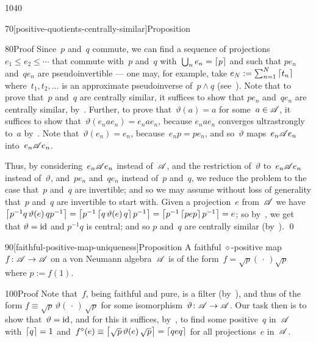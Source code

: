 \begin{parsec}{1040}
\begin{point}{70}[positive-quotients-centrally-similar]{Proposition}
\begin{point}{80}{Proof}
Since~$p$ and~$q$ commute,
we can find a sequence
of projections~$e_1\leq e_2 \leq \dotsb$
that commute with~$p$ and~$q$
with~$\bigcup_n e_n =\left\lceil p\right\rceil$
and such that $pe_n$ and~$qe_n$
are pseudoinvertible --- one may,
for example,
take $e_N:=\sum_{n=1}^N \left\lceil t_n\right\rceil$
where~$t_1,t_2,\dotsc$
is an approximate pseudoinverse
of~$p\wedge q$ (see~).
Note that to prove that~$p$ and~$q$ are centrally similar,
it suffices to show that $pe_n$ and~$qe_n$ are centrally similar,
by~.
Further, to prove that~$\vartheta(a)=a$
for some~$a\in\mathscr{A}$,
it suffices to show that~$\vartheta( e_n a e_n  ) = e_n a e_n$,
because $e_n a e_n$ converges ultrastrongly to~$a$
	by~.
Note that~$\vartheta(e_n)=e_n$,
because~$e_np=pe_n$,
and so~$\vartheta$ maps~$e_n\mathscr{A} e_n$ into~$e_n \mathscr{A} e_n$.

Thus, by considering~$e_n \mathscr{A} e_n$ 
instead of~$\mathscr{A}$,
and the restriction of~$\vartheta$ to~$e_n\mathscr{A} e_n$
instead of~$\vartheta$,
and~$pe_n$ and~$qe_n$
instead of~$p$ and~$q$,
we reduce the problem to the case that~$p$ and~$q$ are invertible;
and so we may assume without loss of generality that~$p$ and~$q$
are invertible to start with.
Given a projection~$e$ from~$\mathscr{A}$
we have $\left\lceil p^{-1}q \,\vartheta(e)\, q p^{-1}\right\rceil
= \left\lceil p^{-1}\left\lceil q\,\vartheta(e)\,q\right\rceil p^{-1}\right\rceil
= \left\lceil p^{-1}\left\lceil pep\right\rceil p^{-1}\right\rceil=e$;
so 
by~,
we get that
$\vartheta=\mathrm{id}$
and
$p^{-1}q$ is central;
and so
$p$ and~$q$ are centrally similar (by~).
\qed
\end{point}
\end{point}
\begin{point}{90}[faithful-positive-map-uniqueness]{Proposition}%
A faithful $\diamond$-positive map $f\colon \mathscr{A}\to\mathscr{A}$
on a von Neumann algebra~$\mathscr{A}$
is of the form~$f=\sqrt{p}(\,\cdot\,)\sqrt{p}$
where $p:=f(1)$.
\begin{point}{100}{Proof}%
Note that~$f$,
being faithful and pure,
is a filter
(by~),
and thus of the form $f\equiv \sqrt{p}\,\vartheta(\,\cdot\,)\,\sqrt{p}$
for some isomorphism~$\vartheta\colon \mathscr{A}\to\mathscr{A}$.
Our task then is to show that~$\vartheta=\mathrm{id}$,
and for this
it suffices, by~,
to find some positive~$q$ in~$\mathscr{A}$ with~$\left\lceil q\right\rceil=1$
and~$f^\diamond(e)\equiv\left\lceil\sqrt{p}\,\vartheta(e)\,\sqrt{p}\right\rceil
= \left\lceil qeq\right\rceil$ for all projections~$e$ in~$\mathscr{A}$.


\end{point}
\end{point}
\end{parsec}
